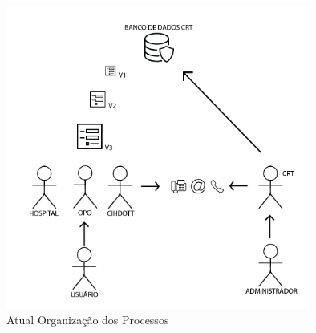 \documentclass[portuguese,oneside]{tcc}
\begin{document}
\begin{figure}[htp]
\centering
\caption{Atual Organização dos Processos}
\includegraphics[width=10cm]{processo-rudimentar}

\label{fig:processo-rudimentar}
\end{figure}
\end{document}
